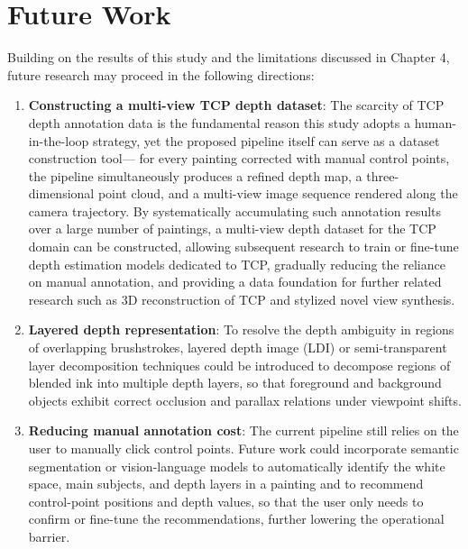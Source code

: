 \section{Future Work}

Building on the results of this study and the limitations discussed in Chapter 4,
future research may proceed in the following directions:

\begin{enumerate}
  \item \textbf{Constructing a multi-view TCP depth dataset}:
        The scarcity of TCP depth annotation data is the fundamental reason this study adopts a human-in-the-loop strategy,
        yet the proposed pipeline itself can serve as a dataset construction tool---
        for every painting corrected with manual control points,
        the pipeline simultaneously produces a refined depth map, a three-dimensional point cloud,
        and a multi-view image sequence rendered along the camera trajectory.
        By systematically accumulating such annotation results over a large number of paintings,
        a multi-view depth dataset for the TCP domain can be constructed,
        allowing subsequent research to train or fine-tune depth estimation models dedicated to TCP,
        gradually reducing the reliance on manual annotation,
        and providing a data foundation for further related research such as 3D reconstruction of TCP and stylized novel view synthesis.

  \item \textbf{Layered depth representation}:
        To resolve the depth ambiguity in regions of overlapping brushstrokes,
        layered depth image (LDI) or semi-transparent layer decomposition techniques could be introduced
        to decompose regions of blended ink into multiple depth layers,
        so that foreground and background objects exhibit correct occlusion and parallax relations under viewpoint shifts.

  \item \textbf{Reducing manual annotation cost}:
        The current pipeline still relies on the user to manually click control points.
        Future work could incorporate semantic segmentation or vision-language models
        to automatically identify the white space, main subjects, and depth layers in a painting and to recommend control-point positions and depth values,
        so that the user only needs to confirm or fine-tune the recommendations, further lowering the operational barrier.


\end{enumerate}
